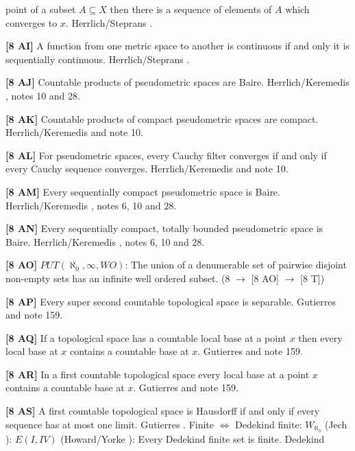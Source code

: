point of a subset $A\subseteq X$ then there is a sequence of elements
of $A$ which converges to $x$. \ac{Herrlich/Steprans} \cite{1997}.
\smallskip
\item{}{\bf [8 AI]} A function from one metric space to another is
continuous if and only it is sequentially continuous.
\ac{Herrlich/Steprans} \cite{1997}.
\smallskip
\item{}{\bf [8 AJ]} Countable products of pseudometric spaces are
Baire. \ac{Herrlich/Keremedis} \cite{1999a}, notes 10 and 28.
\smallskip
\item{}{\bf [8 AK]} Countable products of compact pseudometric spaces are
compact. \ac{Herrlich/Keremedis} \cite{1999a} and note 10.
\smallskip
\item{}{\bf [8 AL]} For pseudometric spaces, every Cauchy filter
converges if and only if every Cauchy sequence converges.
\ac{Herrlich/Keremedis} \cite{1999a} and note 10.
\smallskip
\item{}{\bf [8 AM]} Every sequentially compact pseudometric space is
Baire. \ac{Herrlich/Keremedis} \cite{1999}, notes 6, 10 and 28.
\smallskip
\item{}{\bf [8 AN]} Every sequentially compact, totally bounded
pseudometric space is Baire. \ac{Herrlich/Keremedis} \cite{1999}, notes 6, 10 and 28.
\smallskip
\item{}{\bf [8 AO]} $PUT(\aleph_0,\infty,WO)$: The union of a
denumerable set of pairwise disjoint non-empty sets has an infinite well
ordered subset. (8  $\to$ [8 AO] $\to$ [8 T])
\smallskip
\item{}{\bf [8 AP]} Every super second countable topological space is
separable.  \ac{Gutierres} \cite{2004} and note 159. 
\smallskip
\item{}{\bf [8 AQ]} If a topological space has a countable local base at a
point $x$ then every local base at $x$ contains a countable base at $x$.
\ac{Gutierres} \cite{2004} and note 159.
\smallskip
\item{}{\bf [8 AR]} In a first countable topological space every local
base at a point $x$ contains a countable base at $x$.  \ac{Gutierres}
\cite{2004} and note 159.
\smallskip
\item{}{\bf [8 AS]} A first countable topological space is Hausdorff if
and only if every sequence has at most one limit.  \ac{Gutierres}
\cite{2004}.
\medskip
{} Finite $\Leftrightarrow$ Dedekind finite:
$W_{\aleph_{0}}$ (\ac{Jech} \cite{1973b}): $E(I,IV)$ (\ac{Howard/Yorke}
\cite{1989}): Every Dedekind finite set is finite. \ac{Dedekind} \cite{1888}
